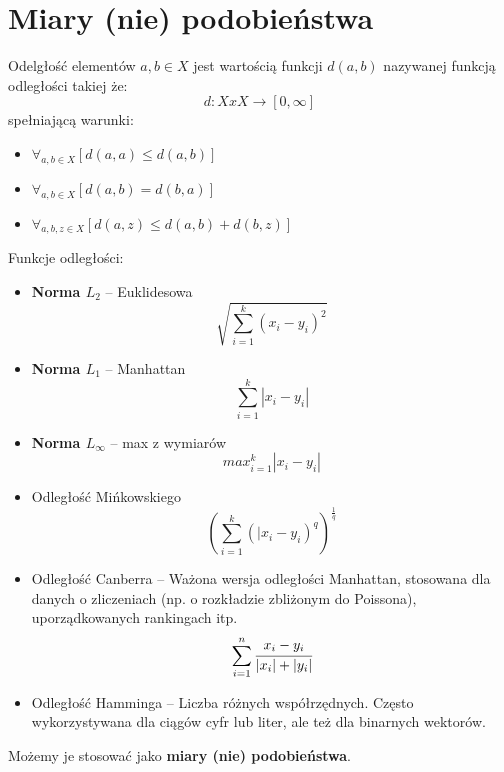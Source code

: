 \section{Miary (nie) podobieństwa}
Odelgłość elementów $a,b \in X$ jest wartością funkcji $d(a,b)$ nazywanej funkcją odległości takiej że:
$$
d:X x X \rightarrow [0,\infty]
$$
 spełniającą warunki:
 \begin{itemize}
     \item $\forall_{a,b \in X} [d(a,a) \le d(a,b)] $
     \item $\forall_{a,b \in X} [d(a,b) = d(b,a)] $
     \item $\forall_{a,b,z \in X} [d(a,z) \le d(a,b)+d(b,z)] $
 \end{itemize}

Funkcje odległości:
\begin{itemize}
    \item \textbf{Norma $L_2$} -- Euklidesowa $$ \sqrt{\sum_{i=1}^k(x_i - y_i)^2} $$
    \item \textbf{Norma $L_1$} -- Manhattan $$ \sum_{i=1}^k|x_i - y_i|$$
    \item \textbf{Norma $L_{\infty}$} -- max z wymiarów $$ max_{i=1}^k |x_i-y_i| $$ 
    \item Odległość Mińkowskiego $$ (\sum_{i=1}^k(|x_i-y_i)^q)^{\frac{1}{q}} $$
    \item Odległość Canberra -- Ważona wersja odległości Manhattan, stosowana dla danych o zliczeniach (np. o rozkładzie zbliżonym do Poissona), uporządkowanych rankingach itp. $$ \sum_{i=1}^n \cfrac{x_i-y_i}{|x_i|+|y_i|} $$
    \item Odległość Hamminga -- Liczba różnych współrzędnych. Często wykorzystywana dla ciągów cyfr lub liter, ale też dla binarnych wektorów. 
\end{itemize} 

Możemy je stosować jako \textbf{miary (nie) podobieństwa}. 